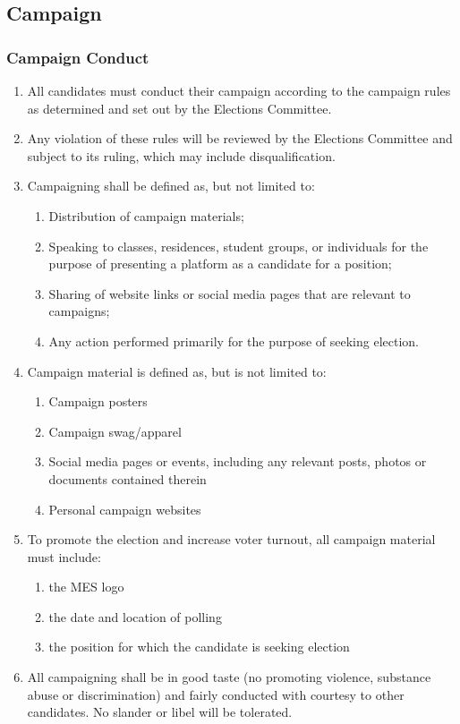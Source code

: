 \hypertarget{campaign}{%
 \subsection{Campaign}
 \label{campaign}}
\hypertarget{campaign-conduct}{%
 \subsubsection{Campaign Conduct}
 \label{campaign-conduct}}
\begin{enumerate}
 \item
  All candidates must conduct their campaign according to the campaign
  rules as determined and set out by the Elections Committee.
 \item
  Any violation of these rules will be reviewed by the Elections
  Committee and subject to its ruling, which may include
  disqualification.
 \item
  Campaigning shall be defined as, but not limited to:

  \begin{enumerate}
   \item
    Distribution of campaign materials;
   \item
    Speaking to classes, residences, student groups, or individuals for
    the purpose of presenting a platform as a candidate for a position;
   \item
    Sharing of website links or social media pages that are relevant to
    campaigns;
   \item
    Any action performed primarily for the purpose of seeking election.
  \end{enumerate}
 \item
  Campaign material is defined as, but is not limited to:

  \begin{enumerate}
   \item
    Campaign posters
   \item
    Campaign swag/apparel
   \item
    Social media pages or events, including any relevant posts, photos
    or documents contained therein
   \item
    Personal campaign websites
  \end{enumerate}
 \item
  To promote the election and increase voter turnout, all campaign
  material must include:

  \begin{enumerate}
   \item
    the MES logo
   \item
    the date and location of polling
   \item
    the position for which the candidate is seeking election
  \end{enumerate}
 \item
  All campaigning shall be in good taste (no promoting violence,
  substance abuse or discrimination) and fairly conducted with courtesy
  to other candidates. No slander or libel will be tolerated.

\end{enumerate}

